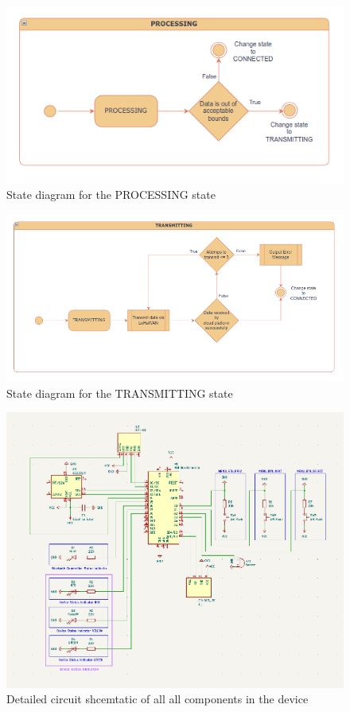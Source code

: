 \begin{figure}[H]
	\centering
	\includegraphics[width=\textwidth]{diagrams/states_processing}
	\caption{State diagram for the PROCESSING state}
	\label{fig:states_processing}
\end{figure}

\begin{figure}[H]
	\centering
	\includegraphics[width=\textwidth]{diagrams/states_transmitting}
	\caption{State diagram for the TRANSMITTING state}
	\label{fig:states_transmitting}
\end{figure}

\begin{figure}[H]
\centering
\includegraphics[width=\textwidth]{diagrams/schematic_rev2}
\caption{Detailed circuit shcemtatic of all all components in the device}
\label{fig:circuit_diagram}
\end{figure}

